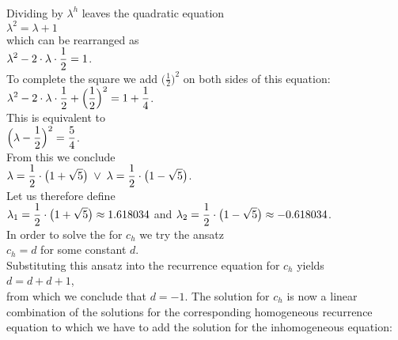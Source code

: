 \\[0.2cm]
Dividing by $\lambda^h$ leaves the quadratic equation
\\[0.2cm]
\hspace*{1.3cm}
$\lambda^2 = \lambda + 1$
\\[0.2cm]
which can be rearranged as
\\[0.2cm]
\hspace*{1.3cm}
$\displaystyle \lambda^2 - 2 \cdot \lambda \cdot \frac{1}{2} = 1$.
\\[0.2cm]
To complete the square we add $\bigl(\frac{1}{2}\bigr)^2$ on both sides of this equation:
\\[0.2cm]
\hspace*{1.3cm}
$\displaystyle \lambda^2 - 2 \cdot \lambda \cdot \frac{1}{2} + \Bigl(\frac{1}{2}\Bigr)^2 = 1 + \frac{1}{4}$.
\\[0.2cm]
This is equivalent to
\\[0.2cm]
\hspace*{1.3cm}
$\displaystyle \Bigl(\lambda - \frac{1}{2}\Bigr)^2 = \frac{5}{4}$. 
\\[0.2cm]
From this we conclude 
\\[0.2cm]
\hspace*{1.3cm}
$\displaystyle\lambda = \frac{1}{2} \cdot \bigl(1 + \sqrt{5}\bigr) \;\vee\; \lambda = \frac{1}{2} \cdot \bigl(1 - \sqrt{5}\bigr)$.
\\[0.2cm]
Let us therefore define 
\\[0.2cm]
\hspace*{1.3cm}
$\displaystyle\lambda_1 =  \frac{1}{2} \cdot \bigl(1 + \sqrt{5}\bigr) \approx  1.618034$ \quad and \quad 
$\displaystyle\lambda_2 = \frac{1}{2} \cdot \bigl(1 - \sqrt{5}\bigr) \approx -0.618034$.
\\[0.2cm]
In order to solve the  for $c_h$ we try the ansatz
\\[0.2cm]
\hspace*{1.3cm}
$c_h = d$ \quad for some constant $d$.
\\[0.2cm]
Substituting this ansatz into the recurrence equation for $c_h$ yields
\\[0.2cm]
\hspace*{1.3cm}
$d = d + d + 1$,
\\[0.2cm]
from which we conclude that $d = -1$.  The solution for $c_h$ is now a linear combination of the solutions for
the corresponding homogeneous recurrence equation to which we have to add the solution for the inhomogeneous equation:
\\[0.2cm]
\hspace*{1.3cm}
